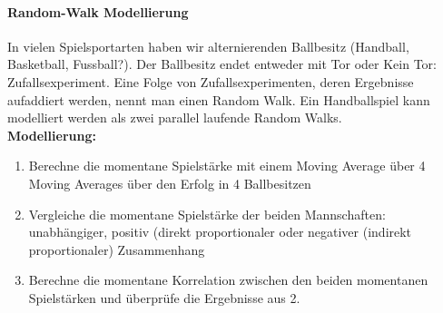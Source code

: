 \paragraph{Random-Walk Modellierung}
In vielen Spielsportarten haben wir alternierenden Ballbesitz (Handball, Basketball, Fussball?).
Der Ballbesitz endet entweder mit Tor oder Kein Tor: Zufallsexperiment.
Eine Folge von Zufallsexperimenten, deren Ergebnisse aufaddiert werden, nennt man einen Random Walk.
Ein Handballspiel kann modelliert werden als zwei parallel laufende Random Walks.\\
\textbf{Modellierung:}\\
\begin{enumerate}
  \vspace{-1em}
  \item Berechne die momentane Spielstärke mit einem Moving Average über 4 Moving Averages über den Erfolg in 4 Ballbesitzen
  \item Vergleiche die momentane Spielstärke der beiden Mannschaften: unabhängiger, positiv (direkt proportionaler oder negativer (indirekt proportionaler) Zusammenhang
  \item Berechne die momentane Korrelation zwischen den beiden momentanen Spielstärken und überprüfe die Ergebnisse aus 2.
\end{enumerate}
